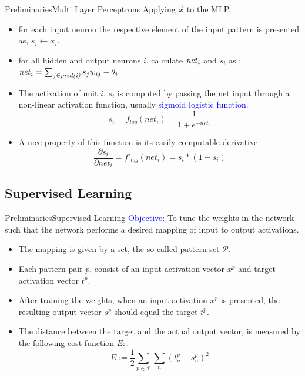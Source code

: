 \documentclass{beamer}
\begin{document}
\begin{frame}{Preliminaries}{Multi Layer Perceptrons}
Applying $ \vec{x} $ to the MLP, 

\begin{itemize}
\item for each input neuron the respective element of the input pattern is presented as, $ s_i \leftarrow x_i $. 
\item for all hidden and output neurons $ i $, calculate  $ \text{\textit{net}}_{i} $ and $ s_i $ as : \\
$  \text{\textit{net}}_{i} = \sum_{j \in \textit{pred(i)}}  s_j w_{ij} - \theta_i$

\pause
\item The activation of unit $ i $, $ s_i $ is computed by passing the net input through a non-linear activation function, usually \textcolor{blue}{sigmoid logistic function.}
\begin{equation*}
s_i = f_{log}(net_i) = \frac{1}{1+ e^{-net_i}}
\end{equation*}

\item A nice property of this function is its easily computable derivative. 
\begin{equation*}
\frac{\partial s_i}{\partial net_i} = f'_{log}(net_i) = s_i * (1-s_i)
\end{equation*}

\end{itemize}
	
\end{frame}	


\subsection{Supervised Learning}
\begin{frame}{Preliminaries}{Supervised Learning}
\textcolor{blue}{Objective:} To tune the weights in the network such that the network performs a desired mapping of input to output activations. 

\pause
\begin{itemize}
\item The mapping is given by a set, the so called pattern set $ \mathscr{P} $. 
\item Each pattern pair $ p $, consist of an input activation vector $ x^p $ and target activation vector $ t^p $. 
\item After training the weights, when an input activation $ x^p $ is presented, the resulting output vector $ s^p $ should equal the target $ t^p $. 
\pause
\item The distance between the target and the actual output vector, is measured by the following cost function $ E: $. 
\begin{equation*}
	E := \frac{1}{2} \sum_{p \in \mathscr{P}} \sum_{n} (t_n^{p} - s_n^{p})^2
\end{equation*}
\end{itemize}	
\end{frame}
\end{document}
